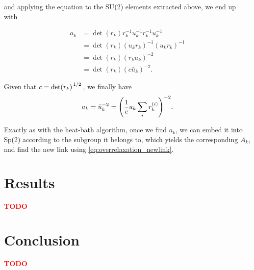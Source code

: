 \documentclass[reqno,12pt]{article}
\numberwithin{equation}{section}
\newcommand{\red}[1]{\textbf{\textcolor{red}{#1}}}
\begin{document}
and applying the equation to the SU(2) elements extracted above, we end up with

\begin{equation}
	\begin{aligned}
		a_k &= \det(r_k) r_k^{-1} u_k^{-1} r_k^{-1} u_k^{-1} \\
		&= \det(r_k) (u_k r_k)^{-1} (u_k r_k)^{-1} \\
		&= \det(r_k) (r_k u_k)^{-2} \\
		&= \det(r_k) (c \bar{u}_k)^{-2}.
	\end{aligned}
\end{equation}

Given that $c = \det(r_k)^{\flatfrac{1}{2}}$, we finally have
\begin{equation}
	a_k = \bar{u}_k^{-2} = \qty(\frac{1}{c} u_k \sum_i r_k^{(i)})^{-2}.
\end{equation}

Exactly as with the heat-bath algorithm, once we find $a_k$, we can embed it into Sp(2) according to the
subgroup it belongs to, which yields the corresponding $A_k$, and find the new link using \eqref{eq:overrelaxation_newlink}.

\section{Results}
\red{TODO}

\section{Conclusion}
\red{TODO}

\printbibliography
\end{document}
